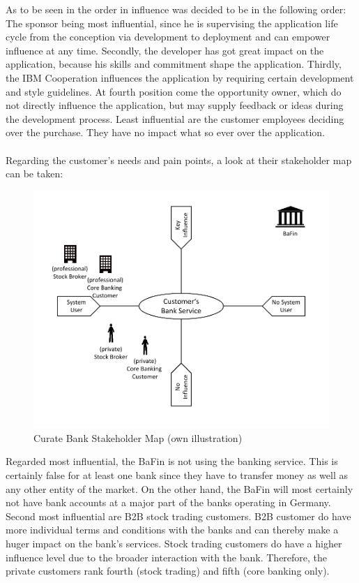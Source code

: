 As to be seen in  the order in influence was decided to be in the following order: The sponsor being most influential, since he is supervising the application life cycle from the conception via development to deployment and can empower influence at any time. Secondly, the developer has got great impact on the application, because his skills and commitment shape the application. Thirdly, the IBM Cooperation influences the application by requiring certain development and style guidelines. At fourth position come the opportunity owner, which do not directly influence the application, but may supply feedback or ideas during the development process. Least influential are the customer employees deciding over the purchase. They have no impact what so ever over the application. 

\paragraph{} Regarding the customer's needs and pain points, a look at their stakeholder map can be taken:

\begin{figure}[H]
    \centering
    \includegraphics[height=.5\textheight]{img/smBank.pdf}
    \caption[Curate Bank Stakeholder Map]{Curate Bank Stakeholder Map (own illustration)}
    \label{fig:my_label}
\end{figure}

Regarded most influential, the BaFin is not using the banking service. This is certainly false for at least one bank since they have to transfer money as well as any other entity of the market. On the other hand, the BaFin will most certainly not have bank accounts at a major part of the banks operating in Germany. Second most influential are B2B stock trading customers. B2B customer do have more individual terms and conditions with the banks and can thereby make a huger impact on the bank's services. Stock trading customers do have a higher influence level due to the broader interaction with the bank. Therefore, the private customers rank fourth (stock trading) and fifth (core banking only).

